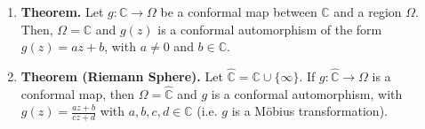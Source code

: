 \documentclass[12pt]{article}
\theoremstyle{definition}
\theoremstyle{named}
\DeclareMathOperator{\Aut}{Aut}
\DeclareMathOperator{\id}{id}
\begin{document}
{\begin{multicols}{2}
\begin{spacing}{1.01}
\begin{enumerate}
\begin{enumerate}
        \item There is an identity map $\id \in \Aut(\Omega)$ such that $\id \circ g(z) = g(z) = g \circ \id(z) = g(z)$. 
    \end{enumerate}
    \item \textbf{Theorem. } Let $g: \mathbb{C} \to \Omega$ be a conformal map between $\mathbb{C}$ and a region $\Omega$. Then, $\Omega = \mathbb{C}$ and $g(z)$ is a conformal automorphism of the form $g(z) = az+b$, with $a \neq 0$ and $b \in \mathbb{C}$. 
    \item \textbf{Theorem (Riemann Sphere). } Let $\hat{\mathbb{C}} = \mathbb{C} \cup \{\infty\}$. If $g: \hat{\mathbb{C}} \to \Omega$ is a conformal map, then $\Omega = \hat{\mathbb{C}}$ and $g$ is a conformal automorphism, with $g(z) = \frac{az+b}{cz+d}$ with $a,b,c,d \in \mathbb{C}$ (i.e. $g$ is a Möbius transformation). 
\end{enumerate}

\end{spacing}
\end{multicols}

}
\end{document}
